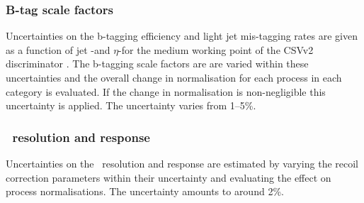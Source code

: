 \subsubsection*{B-tag scale factors}
Uncertainties on the b-tagging efficiency and light jet mis-tagging
rates are given as a function of jet \pT-and $\eta$-for the 
medium working point of the \ac{CSV}v2 discriminator \cite{cms-btag-run2}.
The b-tagging scale factors are are varied within these uncertainties
and the overall change in normalisation for each process in each category is
evaluated. If the change in normalisation is non-negligible this
uncertainty is applied. The uncertainty varies from 1--5\%.
\subsubsection*{\MET~resolution and response}
Uncertainties on the \MET~resolution and response are estimated
by varying the recoil correction parameters within their
uncertainty and evaluating the effect on process
normalisations. The uncertainty amounts to around 2\%.
